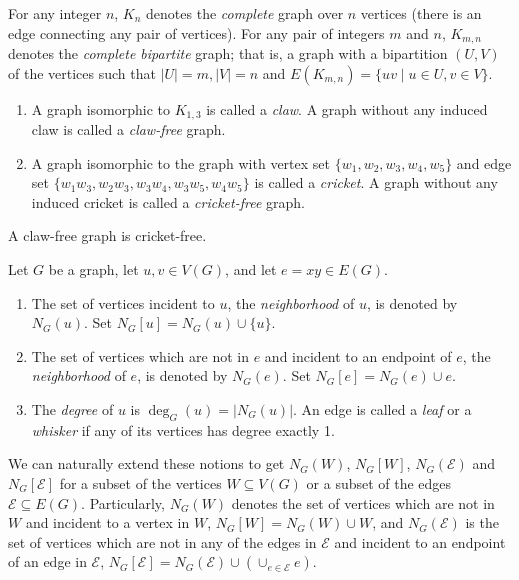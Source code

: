 \documentclass[ALCO,ThmDefs,Unicode,epreuves]{cedram}
\newcommand{\E}{\mathcal{E}}
\begin{document}
For any integer $n$, $K_n$ denotes the \emph{complete} graph over $n$ vertices (\ie there is an edge connecting any pair of vertices). For any pair of integers $m$ and $n$, $K_{m,n}$ denotes the \emph{complete bipartite} graph; that is, a graph with a bipartition $(U,V)$ of the vertices such that $|U| = m, |V| = n$ and $E(K_{m,n}) = \{uv  \mid  u \in U, v \in V\}.$

\begin{defi} \quad
\begin{enumerate}
\item\label{def2.4_1} A graph isomorphic to $K_{1,3}$ is called a \emph{claw}. A graph without any induced claw is called a \emph{claw-free} graph. 
\item\label{def2.4_2} A graph isomorphic to the graph with vertex set $\{w_1,w_2,w_3,w_4,w_5\}$ and edge set $\{w_1w_3,w_2w_3,w_3w_4,w_3w_5,w_4w_5\}$ is called a \emph{cricket}. A graph without any induced cricket is called a \emph{cricket-free} graph.
\end{enumerate}
\end{defi}

\begin{rema}
A claw-free graph is cricket-free.
\end{rema}

\begin{nota} Let $G$ be a graph, let $u,v \in V(G)$, and let $e = xy \in E(G)$.
\begin{enumerate}
\item\label{nota2.6_1} The set of vertices incident to $u$, the \emph{neighborhood} of $u$, is denoted by $N_G(u)$. Set $N_G[u] = N_G(u) \cup \{u\}$.
\item\label{nota2.6_2} The set of vertices which are not in $e$ and incident to an endpoint of $e$, the \emph{neighborhood} of $e$, is denoted by $N_G(e)$. Set $N_G[e] = N_G(e) \cup e.$
\item\label{nota2.6_3} The \emph{degree} of $u$ is $\deg_G(u) = \big|N_G(u)\big|$. An edge is called a \emph{leaf} or a \emph{whisker} if any of its vertices has degree exactly 1.
\end{enumerate}
\end{nota}

We can naturally extend these notions to get $N_G(W)$, $N_G[W]$, $N_G(\E)$ and $N_G[\E]$ for a subset of the vertices $W \subseteq V(G)$ or a subset of the edges $\E \subseteq E(G)$. Particularly, $N_G(W)$ denotes the set of vertices which are not in $W$ and incident to a vertex in $W$, $N_G[W] = N_G(W) \cup W$, and $N_G(\E)$ is the set of vertices which are not in any of the edges in $\E$ and incident to an endpoint of an edge in $\E$, $N_G[\E] = N_G(\E) \cup (\cup_{e \in \E} e)$.
\end{document}

